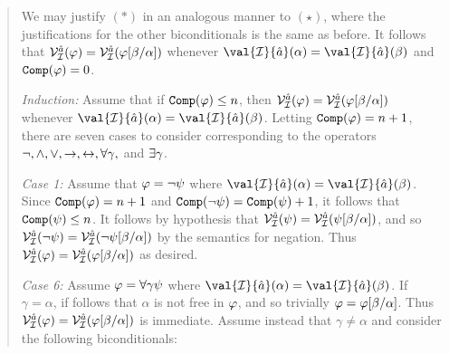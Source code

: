 \begin{quote}
  We may justify $(\ast)$ in an analogous manner to $(\star)$, where the justifications for the other biconditionals is the same as before. 
  It follows that $\mathcal{V}_{\mathcal{I}}^{\hat{a}}(\varphi)=\mathcal{V}_{\mathcal{I}}^{\hat{a}}(\varphi[\beta/\alpha])$ whenever $\val{\I}{\va{a}}(\alpha)=\val{\I}{\va{a}}(\beta)$ and $\texttt{Comp}(\varphi)=0$. 

  \textit{Induction:} Assume that if $\texttt{Comp}(\varphi)\leq n$, then $\mathcal{V}_{\mathcal{I}}^{\hat{a}}(\varphi)=\mathcal{V}_{\mathcal{I}}^{\hat{a}}(\varphi[\beta/\alpha])$ whenever $\val{\I}{\va{a}}(\alpha)=\val{\I}{\va{a}}(\beta)$. 
  Letting $\texttt{Comp}(\varphi)=n+1$, there are seven cases to consider corresponding to the operators $\neg,\wedge,\vee,\rightarrow,\leftrightarrow,\forall \gamma,$ and $\exists \gamma$.

  \textit{Case 1:} Assume that $\varphi=\neg\psi$ where $\val{\I}{\va{a}}(\alpha)=\val{\I}{\va{a}}(\beta)$.
  Since $\texttt{Comp}(\varphi)=n+1$ and $\texttt{Comp}(\neg\psi)=\texttt{Comp}(\psi)+1$, it follows that $\texttt{Comp}(\psi)\leq n$.
  It follows by hypothesis that $\mathcal{V}_{\mathcal{I}}^{\hat{a}}(\psi)=\mathcal{V}_{\mathcal{I}}^{\hat{a}}(\psi[\beta/\alpha])$, and so $\mathcal{V}_{\mathcal{I}}^{\hat{a}}(\neg\psi)=\mathcal{V}_{\mathcal{I}}^{\hat{a}}(\neg\psi[\beta/\alpha])$ by the semantics for negation.
  Thus $\mathcal{V}_{\mathcal{I}}^{\hat{a}}(\varphi)=\mathcal{V}_{\mathcal{I}}^{\hat{a}}(\varphi[\beta/\alpha])$ as desired. 


  \textit{Case 6:} Assume $\varphi=\forall \gamma\psi$ where $\val{\I}{\va{a}}(\alpha)=\val{\I}{\va{a}}(\beta)$.
  If $\gamma=\alpha$, if follows that $\alpha$ is not free in $\varphi$, and so trivially $\varphi=\varphi[\beta/\alpha]$.
  Thus $\mathcal{V}_{\mathcal{I}}^{\hat{a}}(\varphi)=\mathcal{V}_{\mathcal{I}}^{\hat{a}}(\varphi[\beta/\alpha])$ is immediate.
  Assume instead that $\gamma\neq\alpha$ and consider the following biconditionals:


\end{quote}
